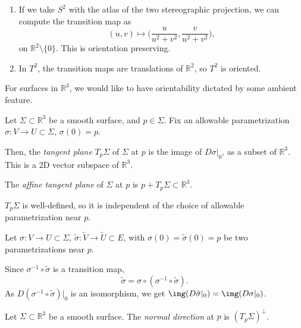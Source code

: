 \documentclass[12pt]{article}
\begin{document}
\begin{exbox}
	\begin{enumerate}[1.]
		\item If we take $S^2$ with the atlas of the two stereographic projection, we can compute the transition map as
			\[
				(u, v) \mapsto \biggl( \frac{u}{u^2 + v^2}, \frac{v}{u^2 + v^2} \biggr)
			,\]
			on $\mathbb{R}^2 \setminus \{0\}$. This is orientation preserving.
		\item In $T^2$, the transition maps are translations of $\mathbb{R}^2$, so $T^2$ is oriented.
	\end{enumerate}
\end{exbox}

For surfaces in $\mathbb{R}^3$, we would like to have orientability dictated by some ambient feature.

\begin{definition}
	Let $\Sigma \subset \mathbb{R}^3$ be a smooth surface, and $p \in \Sigma$. Fix an allowable parametrization $\sigma : V \to U \subset \Sigma$, $\sigma(0) = p$.

	Then, the \emph{tangent plane} $T_p \Sigma$ of $\Sigma$ at $p$ is the image of $D\sigma|_{0}$, as a subset of $\mathbb{R}^3$. This is a 2D vector subspace of $\mathbb{R}^3$.

	The \emph{affine tangent plane} of $\Sigma$ at $p$ is $p + T_p \Sigma \subset \mathbb{R}^3$.
\end{definition}

\begin{lemma}
	$T_p \Sigma$ is well-defined, so it is independent of the choice of allowable parametrization near $p$.
\end{lemma}

\begin{proofbox}
	Let $\sigma : V \to U \subset \Sigma$, $\tilde \sigma : \tilde V \to \tilde U \subset E$, with $\sigma(0) = \tilde \sigma(0) = p$ be two parametrizations near $p$.

	Since $\sigma^{-1} \circ \tilde \sigma$ is a transition map,
	\[
	\tilde \sigma = \sigma \circ (\sigma^{-1} \circ \tilde \sigma)
	.\]
	As $D(\sigma^{-1} \circ \tilde \sigma)|_0$ is an isomorphism, we get $\img(D \tilde \sigma|_0) = \img(D \sigma|_0)$.
\end{proofbox}

\begin{definition}
	Let $\Sigma \subset \mathbb{R}^3$ be a smooth surface. The \emph{normal direction} at $p$ is $(T_p \Sigma)^{\perp}$.
\end{definition}
\end{document}
